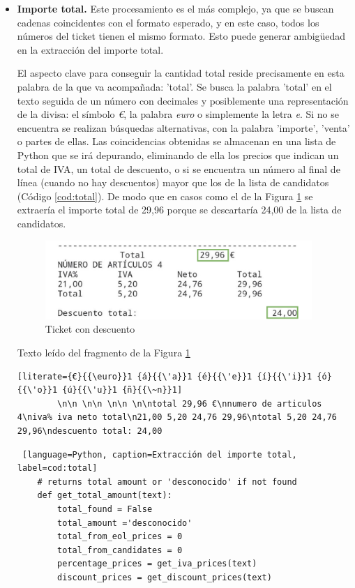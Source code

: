 \begin{itemize}
    \item \textbf{Importe total.} Este procesamiento es el más complejo, ya que se buscan cadenas coincidentes con el formato esperado, y en este caso, todos los números del ticket tienen el mismo formato. Esto puede generar ambigüedad en la extracción del importe total.

    El aspecto clave para conseguir la cantidad total reside precisamente en esta palabra de la que va acompañada: 'total'. Se busca la palabra 'total' en el texto seguida de un número con decimales y posiblemente una representación de la divisa: el símbolo \textit{€}, la palabra \textit{euro} o simplemente la letra \textit{e}.  Si no se encuentra se realizan búsquedas alternativas, con la palabra 'importe', 'venta' o partes de ellas. Las coincidencias obtenidas se almacenan en una lista de Python que se irá depurando, eliminando de ella los precios que indican un total de IVA, un total de descuento, o si se encuentra un número al final de línea (cuando no hay descuentos) mayor que los de la lista de candidatos (Código \ref{cod:total}). De modo que en casos como el de la Figura \ref{fig:get_total_amount_peculiaridades} se extraería el importe total de 29,96 porque se descartaría 24,00 de la lista de candidatos.

    \begin{figure}[ht!]
        \centering
        \includegraphics[height=30mm]{imagenes/get_total_amount_peculiaridades.png}
        \caption{Ticket con descuento}
        \label{fig:get_total_amount_peculiaridades}
    \end{figure}

Texto leído del fragmento de la Figura \ref{fig:get_total_amount_peculiaridades}
    \begin{lstlisting}[literate={€}{{\euro}}1 {á}{{\'a}}1 {é}{{\'e}}1 {í}{{\'i}}1 {ó}{{\'o}}1 {ú}{{\'u}}1 {ñ}{{\~n}}1]
        \n\n \n\n \n\n \n\ntotal 29,96 €\nnumero de articulos 4\niva% iva neto total\n21,00 5,20 24,76 29,96\ntotal 5,20 24,76 29,96\ndescuento total: 24,00
    \end{lstlisting}

    \begin{lstlisting} [language=Python, caption=Extracción del importe total, label=cod:total]
    # returns total amount or 'desconocido' if not found
    def get_total_amount(text):
        total_found = False
        total_amount ='desconocido'
        total_from_eol_prices = 0
        total_from_candidates = 0
        percentage_prices = get_iva_prices(text)
        discount_prices = get_discount_prices(text)


\end{lstlisting}
\end{itemize}
